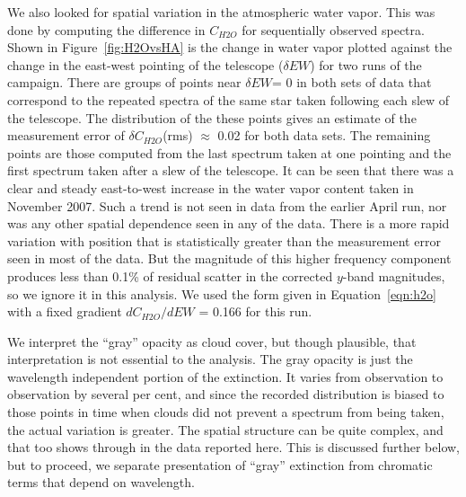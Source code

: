 \documentclass[manuscript]{aastex}
\begin{document}
We also looked for spatial variation in the atmospheric water vapor.
This was done by computing the difference in $C_{H2O}$ for sequentially observed spectra.
Shown in Figure~\ref{fig:H2OvsHA} is the change in water vapor plotted against the change in the east-west pointing of the telescope ($\delta EW$)
for two runs of the campaign. 
There are groups of points near $\delta EW$= 0 in both sets of data that correspond to the repeated spectra 
of the same star taken following each slew of the telescope. 
The distribution of the these points gives an estimate of the measurement error of $\delta C_{H2O}$(rms) $\approx$ 0.02 for both data sets.
The remaining points are those computed from the last spectrum taken at one pointing and the first spectrum taken after a slew of the telescope.
It can be seen that there was a clear and steady east-to-west increase in the water vapor content taken in November 2007.
Such a trend is not seen in data from the earlier April run, nor was any other spatial dependence seen in any of the data.
There is a more rapid variation with position that is statistically greater than the measurement error seen in most of the data.
But the magnitude of this higher frequency component produces less than 0.1\% of residual scatter in the corrected $y$-band magnitudes,
so we ignore it in this analysis.
We used the form given in Equation~\ref{eqn:h2o} with a fixed gradient $dC_{H2O}/dEW$ = 0.166 for this run.


We interpret the ``gray'' opacity as cloud cover, but though plausible, that interpretation is not essential to the analysis.
The gray opacity is just the wavelength independent portion of the extinction.
It varies from observation to observation by several per cent, 
and since the recorded distribution is biased to those points in time when clouds did not prevent a spectrum from being taken,
the actual variation is greater.
The spatial structure can be quite complex, and that too shows through in the data reported here. 
This is discussed further below, but to proceed, we separate presentation of ``gray'' extinction from chromatic terms that depend on wavelength.
\end{document}
